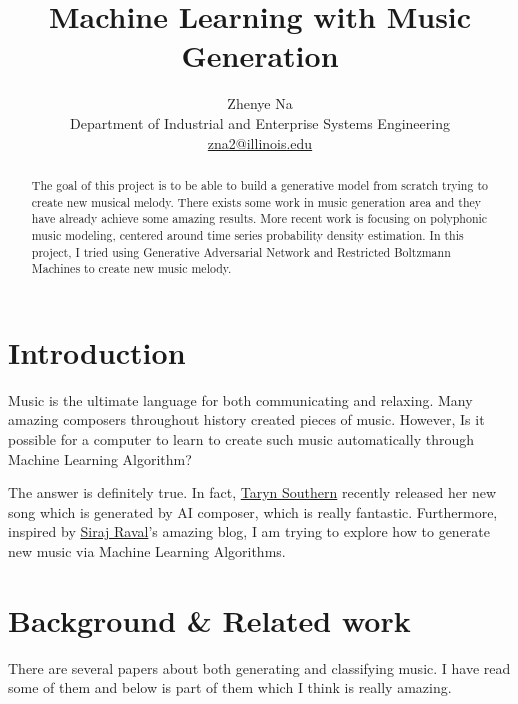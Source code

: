\documentclass[journal, a4paper]{IEEEtran}
\begin{document}
	\title{Machine Learning with Music Generation}
	\author{Zhenye Na\\
    		Department of Industrial and Enterprise Systems Engineering\\
    		\url{zna2@illinois.edu}}
	\maketitle

\begin{abstract}
	The goal of this project is to be able to build a generative model from scratch trying to create new musical melody. There exists some work in music generation area and they have already achieve some amazing results. More recent work is focusing on polyphonic music modeling, centered around time series probability density estimation. In this project, I tried using Generative Adversarial Network and Restricted Boltzmann Machines to create new music melody.
\end{abstract}

\section{Introduction}
	Music is the ultimate language for both communicating and relaxing. Many amazing composers throughout history created pieces of music. However, Is it possible for a computer to learn to create such music automatically through Machine Learning Algorithm?

	The answer is definitely true. In fact, \href{https://www.tarynsouthern.com/}{Taryn Southern} recently released her new song which is generated by AI composer, which is really fantastic. Furthermore, inspired by \href{http://www.sirajraval.com/}{Siraj Raval}'s amazing blog, I am trying to explore how to generate new music via Machine Learning Algorithms.

\section{Background \& Related work}
	There are several papers about both generating and classifying music. I have read some of them and below is part of them which I think is really amazing.
    
\end{document}
